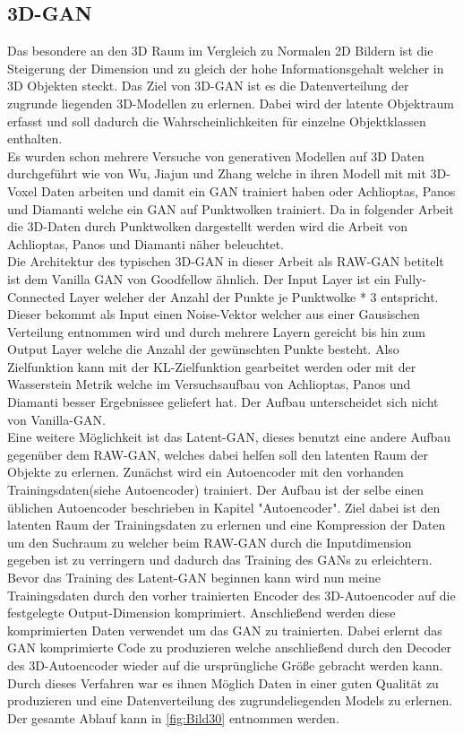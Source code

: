 \documentclass{llncs}
\begin{document}
\subsection{3D-GAN}

Das besondere an den 3D Raum im Vergleich zu Normalen 2D Bildern ist die Steigerung der Dimension und zu gleich der hohe Informationsgehalt welcher in 3D Objekten steckt. Das Ziel von 3D-GAN ist es die Datenverteilung der zugrunde liegenden 3D-Modellen zu erlernen. Dabei wird der latente Objektraum erfasst und soll dadurch die Wahrscheinlichkeiten für einzelne Objektklassen enthalten. 
\\
Es wurden schon mehrere Versuche von generativen Modellen auf 3D Daten durchgeführt wie von Wu, Jiajun und Zhang \cite{3d} welche in ihren Modell mit mit 3D-Voxel Daten arbeiten und damit ein GAN trainiert haben oder Achlioptas, Panos und Diamanti\cite{3dgan} welche ein GAN auf Punktwolken trainiert. Da in folgender Arbeit die 3D-Daten durch Punktwolken dargestellt werden wird die Arbeit von Achlioptas, Panos und Diamanti näher beleuchtet.
\\
Die Architektur des typischen 3D-GAN in dieser Arbeit als RAW-GAN betitelt ist dem Vanilla GAN von Goodfellow ähnlich. Der Input Layer ist ein Fully-Connected Layer welcher der Anzahl der Punkte je Punktwolke * 3 entspricht. Dieser bekommt als Input einen Noise-Vektor welcher aus einer Gausischen Verteilung entnommen wird und durch mehrere Layern gereicht bis hin zum Output Layer welche die Anzahl der gewünschten Punkte besteht. Also Zielfunktion kann mit der KL-Zielfunktion gearbeitet werden oder mit der Wasserstein Metrik welche im Versuchsaufbau von Achlioptas, Panos und Diamanti besser Ergebnissee geliefert hat. Der Aufbau unterscheidet sich nicht von Vanilla-GAN. 
\\
Eine weitere Möglichkeit ist das Latent-GAN, dieses benutzt eine andere Aufbau gegenüber dem RAW-GAN, welches dabei helfen soll den latenten Raum der Objekte zu erlernen. Zunächst wird ein Autoencoder mit den vorhanden Trainingsdaten(siehe Autoencoder) trainiert. Der Aufbau ist der selbe einen üblichen Autoencoder beschrieben in Kapitel "Autoencoder". Ziel dabei ist den latenten Raum der Trainingsdaten zu erlernen und eine Kompression der Daten um den Suchraum zu  welcher beim RAW-GAN durch die Inputdimension gegeben ist zu verringern und dadurch das Training des GANs zu erleichtern. 
\\
Bevor das Training des Latent-GAN beginnen kann wird nun meine Trainingsdaten durch den vorher trainierten Encoder des 3D-Autoencoder auf die festgelegte Output-Dimension komprimiert. Anschließend werden diese komprimierten Daten verwendet um das GAN zu trainierten. Dabei erlernt das GAN komprimierte Code zu produzieren welche anschließend durch den Decoder des 3D-Autoencoder wieder auf die ursprüngliche Größe gebracht werden kann. Durch dieses Verfahren war es ihnen Möglich Daten in einer guten Qualität zu produzieren und eine Datenverteilung des zugrundeliegenden Models zu erlernen. Der gesamte Ablauf kann in \ref{fig:Bild30} entnommen werden. 
\end{document}
